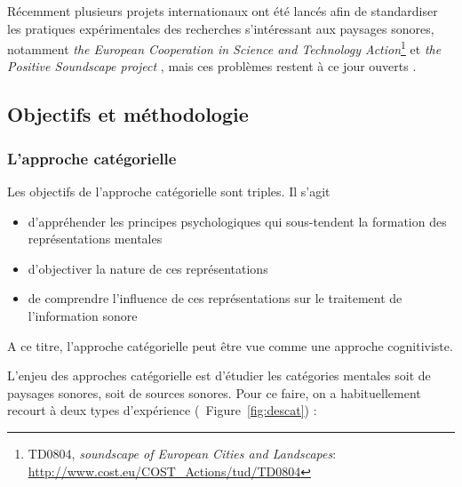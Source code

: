 Récemment plusieurs projets internationaux ont été lancés afin de standardiser les pratiques expérimentales des recherches s’intéressant aux paysages sonores, notamment \emph{ the European Cooperation in Science and Technology Action}\footnote{TD0804, \emph{soundscape of European Cities and Landscapes}: \url{http://www.cost.eu/COST_Actions/tud/TD0804}} \citep{schulte2010soundscape} et \emph{the Positive Soundscape project} \citep{salford2106,davies2013perception}, mais ces problèmes restent à ce jour ouverts \citep{schulte2013soundscape,ribeiro2013heart}.

\subsection{Objectifs et méthodologie}

\subsubsection{L'approche catégorielle}
\label{sec:appCategorielle}

Les objectifs de l'approche catégorielle sont triples. Il s'agit 

\begin{itemize}
\item d'appréhender les principes psychologiques qui sous-tendent la formation des représentations mentales
\item d'objectiver la nature de ces représentations
\item de comprendre l'influence de ces représentations sur le traitement de l'information sonore
\end{itemize}
 
A ce titre, l'approche catégorielle peut être vue comme une approche cognitiviste. 

L'enjeu des approches catégorielle est d'étudier les catégories mentales soit de paysages sonores, soit de sources sonores. Pour ce faire, on a habituellement recourt à deux types d'expérience (\Cf~Figure~\ref{fig:descat}) :

